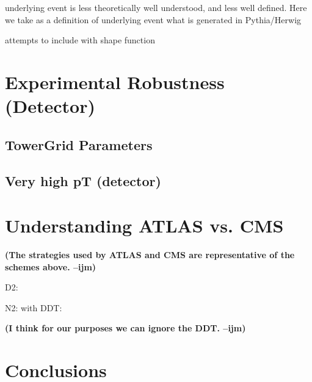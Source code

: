\documentclass[11pt,letterpaper]{article}
\newcommand{\ijm}[1]{\textbf{\textcolor{llblue}{(#1 --ijm)}}}
\begin{document}
underlying event is less theoretically well understood, and less well defined. Here we take as a definition of underlying event what is generated in Pythia/Herwig

attempts to include with shape function \cite{Stewart:2014nna}


\section{Experimental Robustness (Detector)}


\subsection{TowerGrid Parameters}


\subsection{Very high pT (detector)}







\section{Understanding ATLAS vs. CMS}

\ijm{The strategies used by ATLAS and CMS are representative of the schemes above. }

D2:\cite{Larkoski:2015kga}\cite{Larkoski:2014gra}

N2:\cite{Moult:2016cvt}
with DDT:\cite{Dolen:2016kst}

\ijm{I think for our purposes we can ignore the DDT. }

\section{Conclusions}
\end{document}
